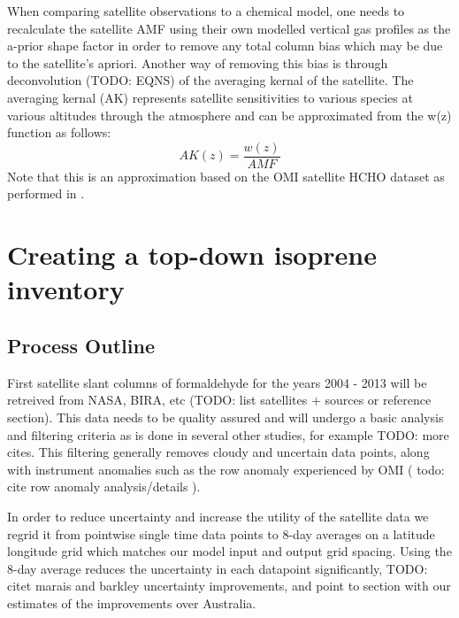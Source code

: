     When comparing satellite observations to a chemical model, one needs to recalculate the satellite AMF using their own modelled vertical gas profiles as the a-prior shape factor in order to remove any total column bias which may be due to the satellite's apriori.
    Another way of removing this bias is through deconvolution (TODO: EQNS) of the averaging kernal of the satellite.
    The averaging kernal (AK) represents satellite sensitivities to various species at various altitudes through the atmosphere and can be approximated from the w(z) function as follows:
    \begin{equation} \label{ch_isop:eqn:AKfromw}
      AK(z) = \frac{w(z)}{AMF}
    \end{equation}
    Note that this is an approximation based on the OMI satellite HCHO dataset as performed in \citet{Gonzalez2015}.
    
    
    
\section{Creating a top-down isoprene inventory}
\label{ch_isop:sec:creatinginventory}

  \subsection{Process Outline}
    First satellite slant columns of formaldehyde for the years 2004 - 2013 will be retreived from NASA, BIRA, etc (TODO: list satellites + sources or reference section).
    This data needs to be quality assured and will undergo a basic analysis and filtering criteria as is done in several other studies, for example \citet{Marais_2012,Barkley_2013} TODO: more cites.
    This filtering generally removes cloudy and uncertain data points, along with instrument anomalies such as the row anomaly experienced by OMI ( todo: cite row anomaly analysis/details ).
    
    In order to reduce uncertainty and increase the utility of the satellite data we regrid it from pointwise single time data points to 8-day averages on a latitude longitude grid which matches our model input and output grid spacing. 
    Using the 8-day average reduces the uncertainty in each datapoint significantly, TODO: citet marais and barkley uncertainty improvements, and point to section with our estimates of the improvements over Australia.
    
